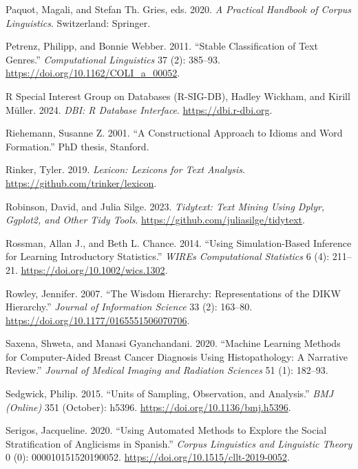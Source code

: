\documentclass[
  letterpaper,
]{latex/krantz}
\newlength{\cslhangindent}
\newenvironment{CSLReferences}[2] %
 {\begin{list}{}{%
  \setlength{\itemindent}{0pt}
  \setlength{\leftmargin}{0pt}
  \setlength{\parsep}{0pt}
  \ifodd #1
   \setlength{\leftmargin}{\cslhangindent}
   \setlength{\itemindent}{-1\cslhangindent}
  \fi
  \setlength{\itemsep}{#2\baselineskip}}}
 {\end{list}}
\theoremstyle{definition}
\theoremstyle{remark}
\begin{document}
\begin{CSLReferences}{1}{0}
Paquot, Magali, and Stefan Th. Gries, eds. 2020. \emph{A Practical
Handbook of Corpus Linguistics}. Switzerland: Springer.

Petrenz, Philipp, and Bonnie Webber. 2011. {``Stable Classification of
Text Genres.''} \emph{Computational Linguistics} 37 (2): 385--93.
\url{https://doi.org/10.1162/COLI_a_00052}.

R Special Interest Group on Databases (R-SIG-DB), Hadley Wickham, and
Kirill Müller. 2024. \emph{DBI: R Database Interface}.
\url{https://dbi.r-dbi.org}.

Riehemann, Susanne Z. 2001. {``A Constructional Approach to Idioms and
Word Formation.''} PhD thesis, Stanford.

Rinker, Tyler. 2019. \emph{Lexicon: Lexicons for Text Analysis}.
\url{https://github.com/trinker/lexicon}.

Robinson, David, and Julia Silge. 2023. \emph{Tidytext: Text Mining
Using Dplyr, Ggplot2, and Other Tidy Tools}.
\url{https://github.com/juliasilge/tidytext}.

Rossman, Allan J., and Beth L. Chance. 2014. {``Using Simulation-Based
Inference for Learning Introductory Statistics.''} \emph{WIREs
Computational Statistics} 6 (4): 211--21.
\url{https://doi.org/10.1002/wics.1302}.

Rowley, Jennifer. 2007. {``The Wisdom Hierarchy: Representations of the
DIKW Hierarchy.''} \emph{Journal of Information Science} 33 (2):
163--80. \url{https://doi.org/10.1177/0165551506070706}.

Saxena, Shweta, and Manasi Gyanchandani. 2020. {``Machine Learning
Methods for Computer-Aided Breast Cancer Diagnosis Using Histopathology:
A Narrative Review.''} \emph{Journal of Medical Imaging and Radiation
Sciences} 51 (1): 182--93.

Sedgwick, Philip. 2015. {``Units of Sampling, Observation, and
Analysis.''} \emph{BMJ (Online)} 351 (October): h5396.
\url{https://doi.org/10.1136/bmj.h5396}.

Serigos, Jacqueline. 2020. {``Using Automated Methods to Explore the
Social Stratification of Anglicisms in Spanish.''} \emph{Corpus
Linguistics and Linguistic Theory} 0 (0): 000010151520190052.
\url{https://doi.org/10.1515/cllt-2019-0052}.


\end{CSLReferences}
\end{document}
